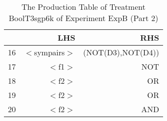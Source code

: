 \begin{table}[ht]
\centering
\begin{tabular}{rrr}
  \hline
 & LHS & RHS \\ 
  \hline
16 & $<$sympairs$>$ & (NOT(D3),NOT(D4)) \\ 
  17 & $<$f1$>$ & NOT \\ 
  18 & $<$f2$>$ & OR \\ 
  19 & $<$f2$>$ & OR \\ 
  20 & $<$f2$>$ & AND \\ 
   \hline
\end{tabular}
\caption{The Production Table of Treatment BoolT3sgp6k of Experiment ExpB (Part 2)} 
\end{table}
